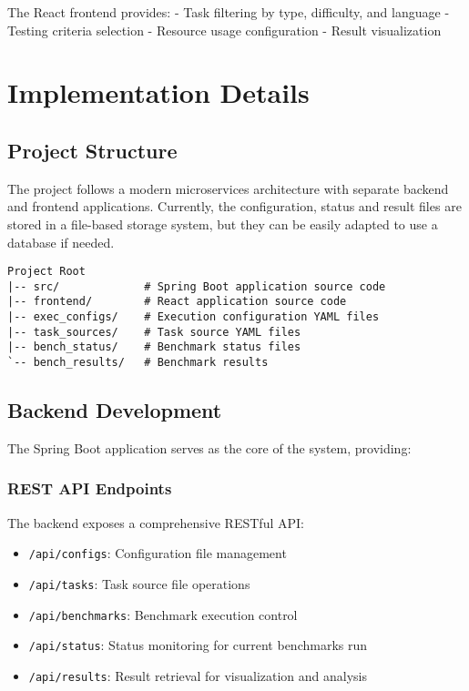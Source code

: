 The React frontend provides:
- Task filtering by type, difficulty, and language
- Testing criteria selection
- Resource usage configuration
- Result visualization

\chapter{Implementation Details}

\section{Project Structure}

The project follows a modern microservices architecture with separate backend and frontend applications.
Currently, the configuration, status and result files are stored in a file-based storage system, but they can be easily adapted to use a database if needed.

\begin{verbatim}
Project Root
|-- src/             # Spring Boot application source code
|-- frontend/        # React application source code
|-- exec_configs/    # Execution configuration YAML files
|-- task_sources/    # Task source YAML files
|-- bench_status/    # Benchmark status files
`-- bench_results/   # Benchmark results
\end{verbatim}

\section{Backend Development}

The Spring Boot application serves as the core of the system, providing:

\subsection{REST API Endpoints}
The backend exposes a comprehensive RESTful API:
\begin{itemize}
    \item \texttt{/api/configs}: Configuration file management
    \item \texttt{/api/tasks}: Task source file operations
    \item \texttt{/api/benchmarks}: Benchmark execution control
    \item \texttt{/api/status}: Status monitoring for current benchmarks run
    \item \texttt{/api/results}: Result retrieval for visualization and analysis
\end{itemize}

